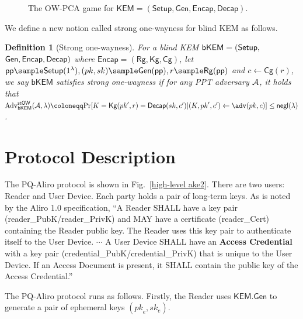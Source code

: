 \documentclass[a4paper,11pt]{article}
\newtheorem{defn}{Definition}[]
\newcommand{\blue}{\color{black}}
\newcommand{\kem}{\mathsf{KEM}}
\newcommand{\bkem}{\mathsf{bKEM}}
\newcommand{\setup}{\mathsf{Setup}}
\newcommand{\owpca}{\textrm{OW-PCA}}
\newcommand{\negli}{\mathsf{negl}}
\newcommand{\rg}{\mathsf{Rg}}
\newcommand{\kg}{\mathsf{Kg}}
\newcommand{\cg}{\mathsf{Cg}}
\newcommand{\ppp}{\mathsf{pp}}
\newcommand{\SEC}{\lambda}
\newcommand{\gen}{\mathsf{Gen}}
\newcommand{\decap}{\mathsf{Decap}}
\newcommand{\encap}{\mathsf{Encap}}
\begin{document}
\begin{sloppypar}
\begin{figure}[!t]
\begin{pchstack}
\begin{pcvstack}
   \end{pcvstack}
   \end{pchstack}
   \caption{The $\owpca$ game for $\kem=(\setup,\mathsf{Gen},\mathsf{Encap},\mathsf{Decap})$.
   }
   \label{OW-PCA}
   \end{figure}

We define a new notion called strong one-wayness for blind KEM as follows.

{\blue
    \begin{defn}[Strong one-wayness]
    For a blind KEM $\bkem=({\sf Setup},$ $ {\sf Gen}, {\sf Encap}, {\sf Decap})$ where $\encap=(\rg, \kg, \cg)$, let $\ppp\sample \setup(1^{\SEC}),(pk,sk)\sample \gen(\ppp), r\sample \rg(\ppp)$ and $c\gets \cg(r)$, we say $\bkem$ satisfies strong one-wayness if for any PPT adversary ${\cal A}$, it holds that
    $\operatorname{Adv}_{\bkem}^{\mathsf{stOW}}(\mathcal{A},\lambda)\coloneqq\mathrm{Pr}[K=\kg({pk}',r)=\decap({sk},c')| (K,{pk}',c')\gets \adv({pk},c)]\leq \negli(\SEC)$.
\end{defn}} 




\section{Protocol Description}
The PQ-Aliro protocol is shown in Fig.~\ref{high-level ake2}. There are two users: Reader and User Device. Each party holds a pair of long-term keys.
As is noted by the Aliro 1.0 specification, ``A Reader SHALL have a key pair (reader\_PubK/reader\_PrivK) and MAY have a certificate (reader\_Cert) containing the Reader public key. The Reader uses this key pair to authenticate itself to the User Device. $\cdots$ A User Device SHALL have an {\bf Access Credential} with a key pair (credential\_PubK/credential\_PrivK) that is unique to the User Device. If an Access Document is present, it SHALL contain the public key of the Access Credential.''

The PQ-Aliro protocol runs as follows.
Firstly, the Reader uses $\kem.\gen$ to generate a pair of ephemeral keys $({pk}_{e}, {sk}_{e})$.


\end{sloppypar}
\end{document}

